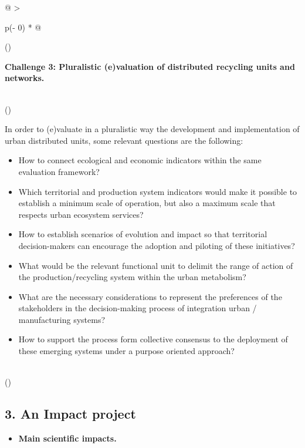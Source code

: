 \documentclass[
  12pt,
  a4paperpaper,
  onecolumn]{article}
\providecommand{\tightlist}{%
  \setlength{\itemsep}{0pt}\setlength{\parskip}{0pt}}\usepackage{longtable,booktabs,array}
\begin{document}
\begin{longtable}[]{@{}
  >{\raggedright\arraybackslash}p{(\columnwidth - 0\tabcolsep) * }@{}}
\toprule()
\begin{minipage}[b]{\linewidth}\raggedright
\textbf{Challenge 3: Pluralistic (e)valuation of distributed recycling
units and networks.}
\end{minipage} \\
\midrule()
\endhead
\begin{minipage}[t]{\linewidth}\raggedright
In order to (e)valuate in a pluralistic way the development and
implementation of urban distributed units, some relevant questions are
the following:

\begin{itemize}
\item
  How to connect ecological and economic indicators within the same
  evaluation framework?
\item
  Which territorial and production system indicators would make it
  possible to establish a minimum scale of operation, but also a maximum
  scale that respects urban ecosystem services?
\item
  How to establish scenarios of evolution and impact so that territorial
  decision-makers can encourage the adoption and piloting of these
  initiatives?
\item
  What would be the relevant functional unit to delimit the range of
  action of the production/recycling system within the urban metabolism?
\item
  What are the necessary considerations to represent the preferences of
  the stakeholders in the decision-making process of integration urban /
  manufacturing systems?
\item
  How to support the process form collective consensus to the deployment
  of these emerging systems under a purpose oriented approach?
\end{itemize}
\end{minipage} \\
\bottomrule()
\end{longtable}

\normalsize

\hypertarget{an-impact-project}{%
\subsection{3. An Impact project}\label{an-impact-project}}

\begin{itemize}
\tightlist
\item
  \textbf{Main scientific impacts.}
\end{itemize}
\end{document}
